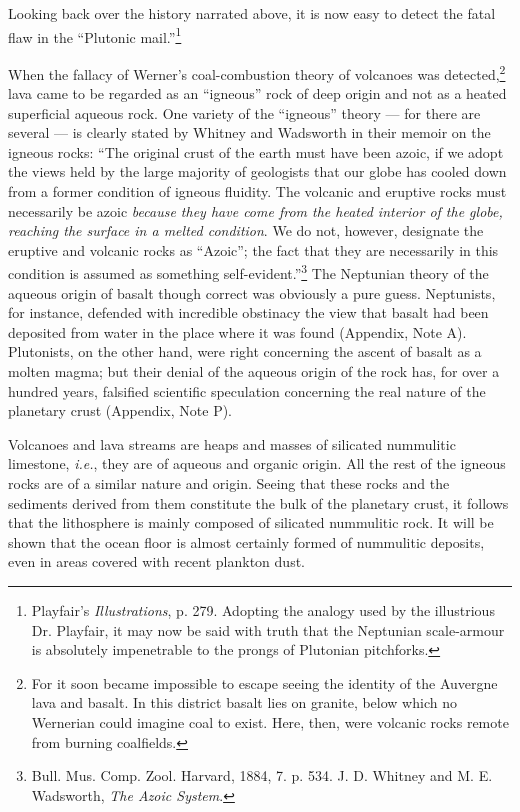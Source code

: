 \documentclass[a4paper, 12pt, oneside]{article}
\begin{document}
Looking back over the history narrated above, it is now easy to detect the fatal flaw in the ``Plutonic mail.''\footnote{Playfair's \emph{Illustrations}, p. 279. Adopting the analogy used by the illustrious Dr. Playfair, it may now be said with truth that the Neptunian scale-armour is absolutely impenetrable to the prongs of Plutonian pitchforks.}

When the fallacy of Werner's coal-combustion theory of volcanoes was detected,\footnote{For it soon became impossible to escape seeing the identity of the Auvergne lava and basalt. In this district basalt lies on granite, below which no Wernerian could imagine coal to exist. Here, then, were volcanic rocks remote from burning coalfields.} lava came to be regarded as an ``igneous'' rock of deep origin and not as a heated superficial aqueous rock. One variety of the ``igneous'' theory --- for there are several --- is clearly stated by Whitney and Wadsworth in their memoir on the igneous rocks: ``The original crust of the earth must have been azoic, if we adopt the views held by the large majority of geologists that our globe has cooled down from a former condition of igneous fluidity. The volcanic and eruptive rocks must necessarily be azoic \emph{because they have come from the heated interior of the globe, reaching the surface in a melted condition}. We do not, however, designate the eruptive and volcanic rocks as ``Azoic''; the fact that they are necessarily in this condition is assumed as something self-evident.''\footnote{Bull. Mus. Comp. Zool. Harvard, 1884, 7. p. 534. J. D. Whitney and M. E. Wadsworth, \emph{The Azoic System}.} The Neptunian theory of the aqueous origin of basalt though correct was obviously a pure guess. Neptunists, for instance, defended with incredible obstinacy the view that basalt had been deposited from water in the place where it was found (Appendix, Note A). Plutonists, on the other hand, were right concerning the ascent of basalt as a molten magma; but their denial of the aqueous origin of the rock has, for over a hundred years, falsified scientific speculation concerning the real nature of the planetary crust (Appendix, Note P).

Volcanoes and lava streams are heaps and masses of silicated nummulitic limestone, \emph{i.e.}, they are of aqueous and organic origin. All the rest of the igneous rocks are of a similar nature and origin. Seeing that these rocks and the sediments derived from them constitute the bulk of the planetary crust, it follows that the lithosphere is mainly composed of silicated nummulitic rock. It will be shown that the ocean floor is almost certainly formed of nummulitic deposits, even in areas covered with recent plankton dust.
\end{document}
